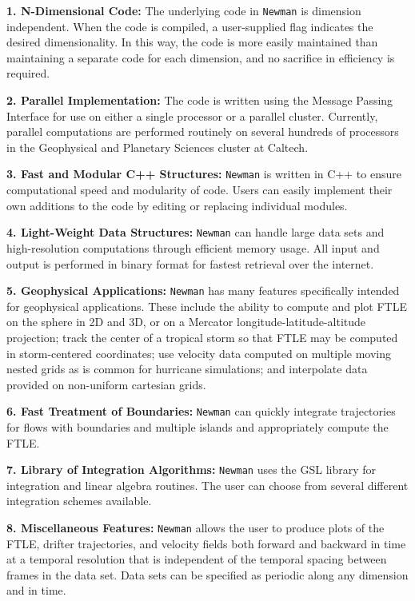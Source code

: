 \documentclass[11pt]{article}
\begin{document}
\begin{description}
\item{\textbf{1. N-Dimensional Code:}}  The underlying code in \texttt{Newman} is dimension independent.  When the code is compiled, a user-supplied flag indicates the desired dimensionality.  In this way, the code is more easily maintained than maintaining a separate code for each dimension, and no sacrifice in efficiency is required.

\item{\textbf{2. Parallel Implementation:}} The code is written using the Message Passing Interface for use on either a single processor or a parallel cluster.  Currently, parallel computations are performed routinely on several hundreds of processors in the Geophysical and Planetary Sciences cluster at Caltech. 

\item{\textbf{3. Fast and Modular C++ Structures:}}  \texttt{Newman} is written in C++ to ensure computational speed and modularity of code.  Users can easily implement their own additions to the code by editing or replacing individual modules. 

\item{\textbf{4. Light-Weight Data Structures:}}  \texttt{Newman} can handle large data sets and high-resolution computations through efficient memory usage.  All input and output is performed in binary format for fastest retrieval over the internet.

\item{\textbf{5. Geophysical Applications:}}  \texttt{Newman} has many features specifically intended for geophysical applications.  These include the ability to compute and plot FTLE on the sphere in 2D and 3D, or on a Mercator longitude-latitude-altitude projection; track the center of a tropical storm so that FTLE may be computed in storm-centered coordinates; use velocity data computed on multiple moving nested grids as is  common for hurricane simulations; and interpolate data provided on non-uniform cartesian grids.

\item{\textbf{6. Fast Treatment of Boundaries:}}  \texttt{Newman} can quickly integrate trajectories for flows with boundaries and multiple islands and appropriately compute the FTLE.

\item{\textbf{7. Library of Integration Algorithms:}}   \texttt{Newman} uses the GSL library for integration and linear algebra routines.  The user can choose from several different integration schemes available.

\item{\textbf{8. Miscellaneous Features:}}  \texttt{Newman} allows the user to produce plots of the FTLE, drifter trajectories, and velocity fields both forward and backward in time at a temporal resolution that is independent of the temporal spacing between frames in the data set.  Data sets can be specified as periodic along any dimension and in time.
\end{description}
\end{document}
